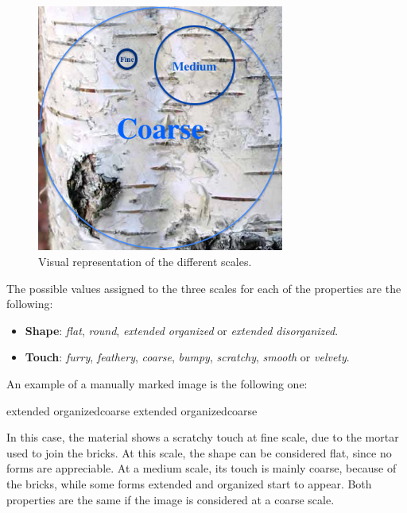 \begin{figure}[!ht]
    \centering
    \includegraphics[width=0.725\textwidth]{Images/Scales.pdf}
    \caption{Visual representation of the different scales.}
    \label{fig:scales}
\end{figure} 
\FloatBarrier  

The possible values assigned to the three scales for each of the properties are the following:

\begin{itemize}
    \item \textbf{Shape}: \emph{flat}, \emph{round}, \emph{extended organized} or \emph{extended disorganized}.
    \item \textbf{Touch}: \emph{furry}, \emph{feathery}, \emph{coarse}, \emph{bumpy}, \emph{scratchy}, \emph{smooth} or \emph{velvety}.
\end{itemize}

An example of a manually marked image is the following one:

\newcommand{\matName}{Brick}
\newcommand{\imgNumber}{02}
{extended organized}{coarse}
{extended organized}{coarse}
{}{}

In this case, the material shows a scratchy touch at fine scale, due to the mortar used to join the bricks. At this scale, the shape can be considered flat, since no forms are appreciable. At a medium scale, its touch is mainly coarse, because of the bricks, while some forms extended and organized start to appear. Both properties are the same if the image is considered at a coarse scale. \\


